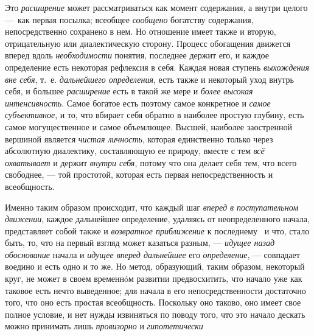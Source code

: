\documentclass[twoside]{article}
\begin{document}
{{Это {\em расширение}
может рассматриваться как момент содержания, а внутри целого
—~как первая посылка; всеобщее
{\em сообщено} богатству
содержания, непосредственно сохранено в нем. Но отношение имеет также и
вторую, отрицательную или диалектическую сторону. Процесс обогащения
движется вперед вдоль
{\em необходимости}
понятия, последнее держит его, и каждое определение есть
некоторая рефлексия в себя. Каждая новая ступень
{\em выхождения вне себя},
т.~е. {\em дальнейшего
определения}, есть также и некоторый уход внутрь себя, и
большее {\em расширение}
есть в такой же мере и
{\em более высокая интенсивность}.
Самое богатое есть поэтому самое конкретное и
{\em самое субъективное},
и то, что вбирает себя обратно в наиболее простую глубину,
есть самое могущественное и самое объемлющее. Высшей, наиболее заостренной
вершиной является {\em чистая
личность}, которая единственно только через абсолютную
диалектику, составляющую ее природу, вместе с тем
{\em всё охватывает} и
держит {\em внутри себя},
потому что она делает себя тем, что всего свободнее, —
той простотой, которая есть первая непосредственность и
всеобщность.

Именно таким образом происходит, что каждый шаг
{\em вперед в поступательном движении},
каждое дальнейшее определение, удаляясь от неопределенного
начала, представляет собой также и
{\em возвратное приближение} к последнему~\label{bkm:bm128}
и что, стало быть, то, что на первый взгляд может казаться
разным, — {\em идущее назад
обоснование} начала и
{\em идущее вперед дальнейшее}
его {\em определение}, —
совпадает воедино и есть одно и то же. Но метод, образующий,
таким образом, некоторый круг, не может в своем временнóм развитии
предвосхитить, что начало уже как таковое есть нечто выведенное; для начала
в его непосредственности достаточно того, что оно есть простая всеобщность.
Поскольку оно таково, оно имеет свое полное условие, и нет нужды извиняться
по поводу того, что это начало дескать можно принимать лишь
{\em провизорно} и
{\em гипотетически}~}}
\end{document}
